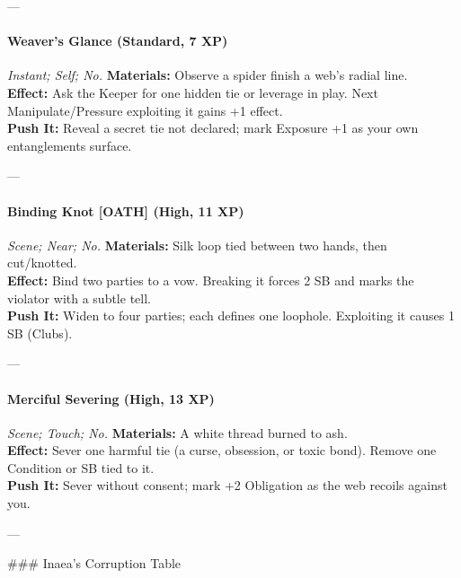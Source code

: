 ---

\paragraph*{Weaver’s Glance (Standard, 7 XP)} \emph{Instant; Self; No.}  
\textbf{Materials:} Observe a spider finish a web’s radial line.\\
\textbf{Effect:} Ask the Keeper for one hidden tie or leverage in play. Next Manipulate/Pressure exploiting it gains +1 effect.\\
\textbf{Push It:} Reveal a secret tie not declared; mark Exposure +1 as your own entanglements surface.  

---

\paragraph*{Binding Knot [OATH] (High, 11 XP)} \emph{Scene; Near; No.}  
\textbf{Materials:} Silk loop tied between two hands, then cut/knotted.\\
\textbf{Effect:} Bind two parties to a vow. Breaking it forces 2 SB and marks the violator with a subtle tell.\\
\textbf{Push It:} Widen to four parties; each defines one loophole. Exploiting it causes 1 SB (Clubs).  

---

\paragraph*{Merciful Severing (High, 13 XP)} \emph{Scene; Touch; No.}  
\textbf{Materials:} A white thread burned to ash.\\
\textbf{Effect:} Sever one harmful tie (a curse, obsession, or toxic bond). Remove one Condition or SB tied to it.\\
\textbf{Push It:} Sever without consent; mark +2 Obligation as the web recoils against you.  

---

### Inaea’s Corruption Table

